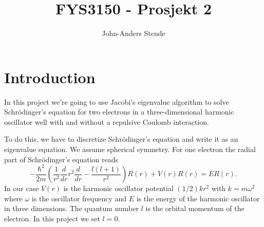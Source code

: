 \documentclass[a4paper,12pt, english]{article}
\title{FYS3150 - Prosjekt 2}
\author{John-Anders Stende}
\begin{document}
\section*{Introduction}

In this project we're going to use Jacobi's eigenvalue algorithm to solve Schr\"odinger's equation for two 
electrons in a three-dimensional harmonic oscillator well with and without a repulsive Coulomb interaction.

To do this, we have to discretize Schr\"odinger's equation and write it as an eigenvalue equation. We assume 
spherical symmetry. For one electron the radial part of Schr\"odinger's equation reads
\[
  -\frac{\hbar^2}{2 m} \left ( \frac{1}{r^2} \frac{d}{dr} r^2
  \frac{d}{dr} - \frac{l (l + 1)}{r^2} \right )R(r) 
     + V(r) R(r) = E R(r).
\]
In our case $V(r)$ is the harmonic oscillator potential $(1/2)kr^2$ with
$k=m\omega^2$ where $\omega$ is the oscillator frequency and $E$ is
the energy of the harmonic oscillator in three dimensions. The quantum number $l$ is the orbital
momentum of the electron. In this project we set $l = 0$.
\end{document}
